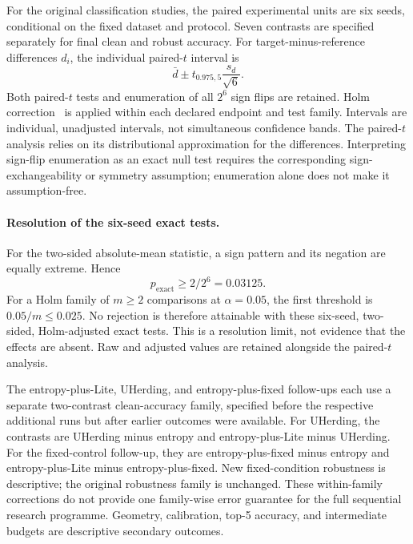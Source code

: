 \documentclass[10pt,a4paper,twocolumn]{article}
\begin{document}
For the original classification studies, the paired experimental units
are six seeds, conditional on the fixed dataset and protocol.
Seven contrasts are specified separately for final clean and
robust accuracy. For target-minus-reference differences $d_i$,
the individual paired-$t$ interval is
\[
 \bar d\pm t_{0.975,5}\frac{s_d}{\sqrt6}.
\]
Both paired-$t$ tests and enumeration of all $2^6$ sign flips
are retained. Holm correction~\cite{holm1979} is applied within
each declared endpoint and test family.
Intervals are individual, unadjusted intervals, not simultaneous
confidence bands. The paired-$t$ analysis relies on its
distributional approximation for the differences. Interpreting
sign-flip enumeration as an exact null test requires the
corresponding sign-exchangeability or symmetry assumption;
enumeration alone does not make it assumption-free.

\paragraph{Resolution of the six-seed exact tests.}
\label{sec:exact_resolution}
For the two-sided absolute-mean statistic, a sign pattern and its
negation are equally extreme. Hence
\begin{equation}
 p_{\mathrm{exact}}\ge 2/2^6=0.03125.
 \label{eq:exact_resolution}
\end{equation}
For a Holm family of $m\ge2$ comparisons at $\alpha=0.05$, the first
threshold is $0.05/m\le0.025$. No rejection is therefore attainable
with these six-seed, two-sided, Holm-adjusted exact tests. This is a
resolution limit, not evidence that the effects are absent. Raw and
adjusted values are retained alongside the paired-$t$ analysis.

The entropy-plus-Lite, UHerding, and entropy-plus-fixed follow-ups each
use a separate two-contrast clean-accuracy family, specified before the
respective additional runs but after earlier outcomes were available.
For UHerding, the contrasts are UHerding minus entropy and
entropy-plus-Lite minus UHerding. For the fixed-control follow-up, they
are entropy-plus-fixed minus entropy and entropy-plus-Lite minus
entropy-plus-fixed. New fixed-condition robustness is descriptive;
the original robustness family is unchanged.
These within-family corrections do not provide one family-wise
error guarantee for the full sequential research programme.
Geometry, calibration, top-5 accuracy, and intermediate budgets
are descriptive secondary outcomes.
\end{document}
